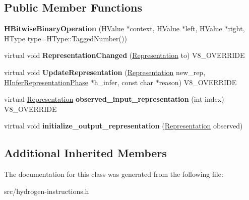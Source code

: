 \subsection*{Public Member Functions}
\begin{DoxyCompactItemize}
\item 
\hypertarget{classv8_1_1internal_1_1_h_bitwise_binary_operation_afc516f0c0ae3d5188e0b6e26acac3977}{}{\bfseries H\+Bitwise\+Binary\+Operation} (\hyperlink{classv8_1_1internal_1_1_h_value}{H\+Value} $\ast$context, \hyperlink{classv8_1_1internal_1_1_h_value}{H\+Value} $\ast$left, \hyperlink{classv8_1_1internal_1_1_h_value}{H\+Value} $\ast$right, H\+Type type=H\+Type\+::\+Tagged\+Number())\label{classv8_1_1internal_1_1_h_bitwise_binary_operation_afc516f0c0ae3d5188e0b6e26acac3977}

\item 
\hypertarget{classv8_1_1internal_1_1_h_bitwise_binary_operation_abd8b367dfddb347270c00024bb07bfcf}{}virtual void {\bfseries Representation\+Changed} (\hyperlink{classv8_1_1internal_1_1_representation}{Representation} to) V8\+\_\+\+O\+V\+E\+R\+R\+I\+D\+E\label{classv8_1_1internal_1_1_h_bitwise_binary_operation_abd8b367dfddb347270c00024bb07bfcf}

\item 
\hypertarget{classv8_1_1internal_1_1_h_bitwise_binary_operation_ae223c790de2249fd3c6c451475f3fc7d}{}virtual void {\bfseries Update\+Representation} (\hyperlink{classv8_1_1internal_1_1_representation}{Representation} new\+\_\+rep, \hyperlink{classv8_1_1internal_1_1_h_infer_representation_phase}{H\+Infer\+Representation\+Phase} $\ast$h\+\_\+infer, const char $\ast$reason) V8\+\_\+\+O\+V\+E\+R\+R\+I\+D\+E\label{classv8_1_1internal_1_1_h_bitwise_binary_operation_ae223c790de2249fd3c6c451475f3fc7d}

\item 
\hypertarget{classv8_1_1internal_1_1_h_bitwise_binary_operation_a9b5341816d204f607aef4e934cb775b9}{}virtual \hyperlink{classv8_1_1internal_1_1_representation}{Representation} {\bfseries observed\+\_\+input\+\_\+representation} (int index) V8\+\_\+\+O\+V\+E\+R\+R\+I\+D\+E\label{classv8_1_1internal_1_1_h_bitwise_binary_operation_a9b5341816d204f607aef4e934cb775b9}

\item 
\hypertarget{classv8_1_1internal_1_1_h_bitwise_binary_operation_afcd0110fe2dea0a3d75aabd5b8b9241b}{}virtual void {\bfseries initialize\+\_\+output\+\_\+representation} (\hyperlink{classv8_1_1internal_1_1_representation}{Representation} observed)\label{classv8_1_1internal_1_1_h_bitwise_binary_operation_afcd0110fe2dea0a3d75aabd5b8b9241b}

\end{DoxyCompactItemize}
\subsection*{Additional Inherited Members}


The documentation for this class was generated from the following file\+:\begin{DoxyCompactItemize}
\item 
src/hydrogen-\/instructions.\+h\end{DoxyCompactItemize}
